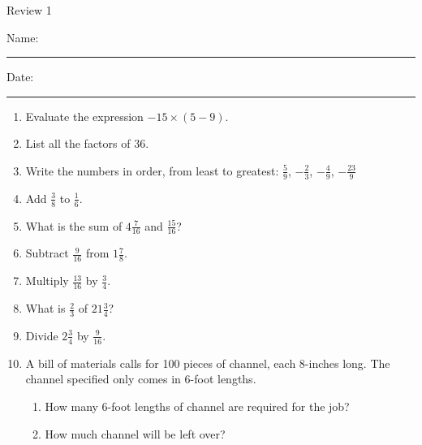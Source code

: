 \documentclass[12pt]{article}
\begin{document}
\pagestyle{empty} %
\begin{center}
          Review 1 \\[0.5in]
\end{center}
Name: \rule{4in}{0.005in} Date: \rule{1.5in}{0.005in} 
  \vspace{0.25in}

\begin{enumerate}

\item Evaluate the expression $-15\times(5-9)$.
  \vspace{0.5in}

\item List all the factors of $36$.
  \vspace{0.5in}

\item Write the numbers in order, from least to greatest: \hspace{0.32in} $\frac{5}{9}$, $-\frac{2}{3}$, $-\frac{4}{9}$, $-\frac{23}{9}$ 
  \vspace{0.5in}

\item Add $\frac{3}{8}$ to $\frac{1}{6}$.  
  \vspace{0.5in}

\item What is the sum of $4\frac{7}{16}$ and $\frac{15}{16}$? 
  \vspace{0.5in}

\item Subtract $\frac{9}{16}$ from $1\frac{7}{8}$.  
  \vspace{0.5in}

\item Multiply $\frac{13}{16}$ by $\frac{3}{4}$. 
  \vspace{0.5in}

\item What is $\frac{2}{3}$ of $21\frac{3}{4}$?  
  \vspace{0.5in}

\item Divide $2\frac{3}{4}$ by $\frac{9}{16}$. 
  \vspace{0.5in}

  \pagebreak 

\item A bill of materials calls for 100 pieces of channel, each 8-inches long. The channel specified only comes in 6-foot lengths. 
	\begin{enumerate}
		\item How many 6-foot lengths of channel are required for the job? 
  \vspace{0.5in}
		\item How much channel will be left over? 
  \vspace{0.5in}
	\end{enumerate}
  \vspace{0.5in}


\end{enumerate}
\end{document}
